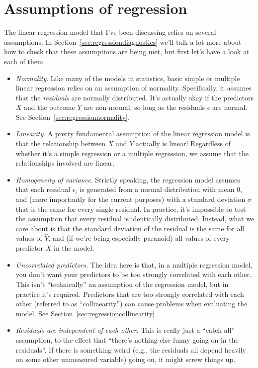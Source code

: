 \section{Assumptions of regression~\label{sec:regressionassumptions}}

The linear regression model that I've been discussing relies on several assumptions. In Section~\ref{sec:regressiondiagnostics} we'll talk a lot more about how to check that these assumptions are being met, but first let's have a look at each of them.

\begin{itemize}
\item {\it Normality}. Like many of the models in statistics, basic simple or multiple linear regression relies on an assumption of normality. Specifically, it assumes that the {\it residuals} are normally distributed. It's actually okay if the predictors $X$ and the outcome $Y$ are non-normal, so long as the residuals $\epsilon$ are normal. See Section~\ref{sec:regressionnormality}.
\item {\it Linearity}. A pretty fundamental assumption of the linear regression model is that the relationship between $X$ and $Y$ actually is linear! Regardless of whether it's a simple regression or a multiple regression, we assume that the relationships involved are linear. 
\item {\it Homogeneity of variance}. Strictly speaking, the regression model assumes that each residual $\epsilon_i$ is generated from a normal distribution with mean 0, and (more importantly for the current purposes) with a standard deviation $\sigma$ that is the same for every single residual. In practice, it's impossible to test the assumption that every residual is identically distributed. Instead, what we care about is that the standard deviation of the residual is the same for all values of $\hat{Y}$, and (if we're being especially paranoid) all values of every predictor $X$ in the model. 
\item {\it Uncorrelated predictors}. The idea here is that, in a multiple regression model, you don't want your predictors to be too strongly correlated with each other. This isn't  ``technically'' an assumption of the regression model, but in practice it's required. Predictors that are too strongly correlated with each other (referred to as ``collinearity'') can cause problems when evaluating the model. See Section~\ref{sec:regressioncollinearity}
\item {\it Residuals are independent of each other}. This is really just a ``catch all'' assumption, to the effect that ``there's nothing else funny going on in the residuals''. If there is something weird (e.g., the residuals all depend heavily on some other unmeasured variable) going on, it might screw things up.

\end{itemize}
